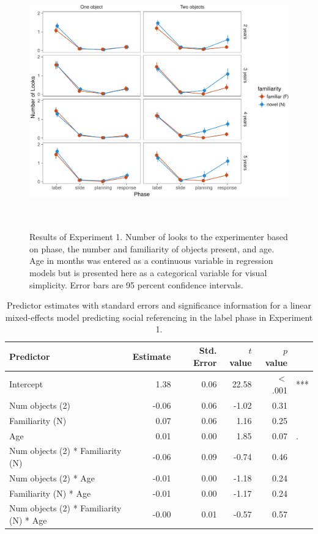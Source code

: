 \documentclass[a4paper,man,apacite,floatsintext]{apa6}
\newenvironment{CodeChunk}{}{}
\begin{document}
\begin{CodeChunk}
\begin{figure}[b]

{\centering \includegraphics[width=5.75in,height=4.35in]{figs/results_e1-1} 

}

\caption[Results of Experiment 1]{Results of Experiment 1. Number of looks to the experimenter based on phase, the number and familiarity of objects present, and age. Age in months was entered as a continuous variable in regression models but is presented here as a categorical variable for visual simplicity. Error bars are 95 percent confidence intervals.}\label{fig:results_e1}
\end{figure}
\end{CodeChunk}

\begin{table}[b]
\centering
\begin{tabular}{lrrrrl}
 Predictor & Estimate & Std. Error & $t$ value & $p$ value &  \\ 
  \hline
Intercept & 1.38 & 0.06 & 22.58 & $<$ .001 & *** \\ 
  Num objects (2) & -0.06 & 0.06 & -1.02 & 0.31 &  \\ 
  Familiarity (N) & 0.07 & 0.06 & 1.16 & 0.25 &  \\ 
  Age & 0.01 & 0.00 & 1.85 & 0.07 & . \\ 
  Num objects (2) * Familiarity (N) & -0.06 & 0.09 & -0.74 & 0.46 &  \\ 
  Num objects (2) * Age & -0.01 & 0.00 & -1.18 & 0.24 &  \\ 
  Familiarity (N) * Age & -0.01 & 0.00 & -1.17 & 0.24 &  \\ 
  Num objects (2) * Familiarity (N) * Age & -0.00 & 0.01 & -0.57 & 0.57 &  \\ 
   \hline
\end{tabular}
\caption{Predictor estimates with standard errors and significance information for a linear mixed-effects model predicting social referencing in the label phase in Experiment 1.} 
\label{tab:exp1_l_reg}
\end{table}
\end{document}
